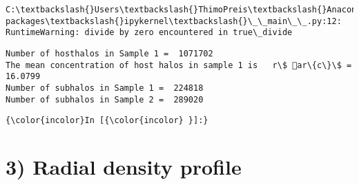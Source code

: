 \documentclass[11pt]{article}
\begin{document}
    \begin{Verbatim}[commandchars=\\\{\}]
C:\textbackslash{}Users\textbackslash{}ThimoPreis\textbackslash{}Anaconda3\textbackslash{}lib\textbackslash{}site-packages\textbackslash{}ipykernel\textbackslash{}\_\_main\_\_.py:12: RuntimeWarning: divide by zero encountered in true\_divide

    \end{Verbatim}

    \begin{Verbatim}[commandchars=\\\{\}]
Number of hosthalos in Sample 1 =  1071702
The mean concentration of host halos in sample 1 is   r\$ ar\{c\}\$ =  16.0799
Number of subhalos in Sample 1 =  224818
Number of subhalos in Sample 2 =  289020

    \end{Verbatim}

    \begin{Verbatim}[commandchars=\\\{\}]
{\color{incolor}In [{\color{incolor} }]:} 
\end{Verbatim}

    \section{3) Radial density profile}\label{radial-density-profile}
\end{document}
